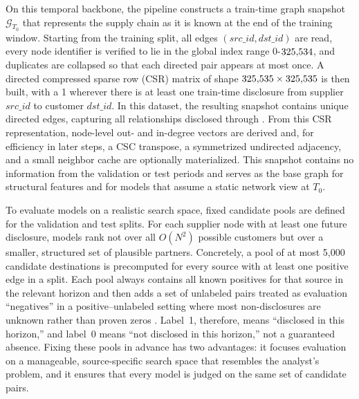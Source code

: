 On this temporal backbone, the pipeline constructs a train-time graph snapshot \(\mathcal{G}_{T_0}\) that represents the supply chain as it is known at the end of the training window. Starting from the training split, all edges \((\mathit{src\_id}, \mathit{dst\_id})\) are read, every node identifier is verified to lie in the global index range \(0\)-\(325{,}534\), and duplicates are collapsed so that each directed pair appears at most once. A directed compressed sparse row (CSR) matrix of shape \(325{,}535 \times 325{,}535\) is then built, with a 1 wherever there is at least one train-time disclosure from supplier \(\mathit{src\_id}\) to customer \(\mathit{dst\_id}\). In this dataset, the resulting snapshot contains \TrainEdges unique directed edges, capturing all relationships disclosed through \TrainCutoffDate. From this CSR representation, node-level out- and in-degree vectors are derived and, for efficiency in later steps, a CSC transpose, a symmetrized undirected adjacency, and a small neighbor cache are optionally materialized. This snapshot contains no information from the validation or test periods and serves as the base graph for structural features and for models that assume a static network view at \(T_0\).

To evaluate models on a realistic search space, fixed candidate pools are defined for the validation and test splits. For each supplier node with at least one future disclosure, models rank not over all \(O(N^2)\) possible customers but over a smaller, structured set of plausible partners. Concretely, a pool of at most 5{,}000 candidate destinations is precomputed for every source with at least one positive edge in a split. Each pool always contains all known positives for that source in the relevant horizon and then adds a set of unlabeled pairs treated as evaluation ``negatives'' in a positive--unlabeled setting where most non-disclosures are unknown rather than proven zeros \parencite{bekker_learning_2020}. Label~1, therefore, means ``disclosed in this horizon,'' and label~0 means ``not disclosed in this horizon,'' not a guaranteed absence. Fixing these pools in advance has two advantages: it focuses evaluation on a manageable, source-specific search space that resembles the analyst's problem, and it ensures that every model is judged on the same set of candidate pairs.

